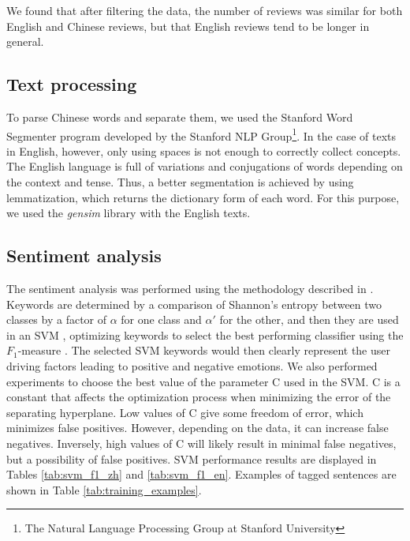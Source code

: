 \documentclass[smallextended,natbib]{svjour3}       %
\begin{document}
We found that after filtering the data, the number of reviews was similar for both English and Chinese reviews, but that English reviews tend to be longer in general.

\subsection{Text processing}\label{textprocessing}

To parse Chinese words and separate them, we used the Stanford Word Segmenter \cite[][]{chang2008} program developed by the Stanford NLP Group\footnote{\label{stanfordnlp}The Natural Language Processing Group at Stanford University}. In the case of texts in English, however, only using spaces is not enough to correctly collect concepts. The English language is full of variations and conjugations of words depending on the context and tense. Thus, a better segmentation is achieved by using lemmatization, which returns the dictionary form of each word. For this purpose, we used the \textit{gensim} library with the English texts.

\subsection{Sentiment analysis}\label{sentimentanalysis}

The sentiment analysis was performed using the methodology described in \cite{Aleman2018ICAROB}. Keywords are determined by a comparison of Shannon's entropy \cite[][]{shannon1948} between two classes by a factor of \(\alpha\) for one class and \(\alpha'\) for the other, and then they are used in an SVM \cite[][]{cortes1995}, optimizing keywords to select the best performing classifier using the \(F_1\)-measure \cite{powers2011}. The selected SVM keywords would then clearly represent the user driving factors leading to positive and negative emotions. We also performed experiments to choose the best value of the parameter C used in the SVM. C is a constant that affects the optimization process when minimizing the error of the separating hyperplane. Low values of C give some freedom of error, which minimizes false positives. However, depending on the data, it can increase false negatives. Inversely, high values of C will likely result in minimal false negatives, but a possibility of false positives. SVM performance results are displayed in  Tables \ref{tab:svm_f1_zh} and \ref{tab:svm_f1_en}. Examples of tagged sentences are shown in Table \ref{tab:training_examples}. 
\end{document}

